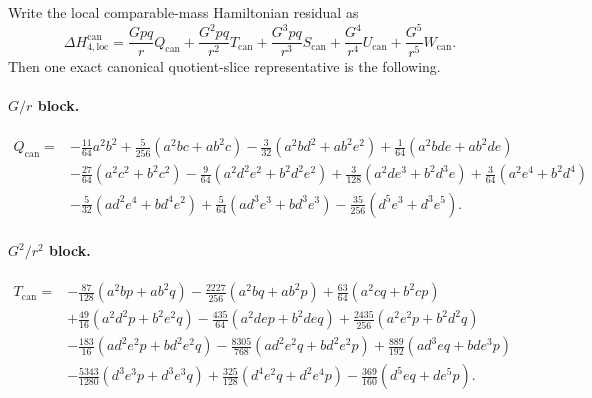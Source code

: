 \documentclass[11pt]{article}
\begin{document}
Write the local comparable-mass Hamiltonian residual as
\begin{equation}
\Delta H_{4,\mathrm{loc}}^{\mathrm{can}}
=
\frac{Gpq}{r}Q_{\mathrm{can}}
+
\frac{G^2pq}{r^2}T_{\mathrm{can}}
+
\frac{G^3pq}{r^3}S_{\mathrm{can}}
+
\frac{G^4}{r^4}U_{\mathrm{can}}
+
\frac{G^5}{r^5}W_{\mathrm{can}}.
\label{eq:app-canonical-slice-representative}
\end{equation}
Then one exact canonical quotient-slice representative is the following.

\paragraph{$G/r$ block.}
\begin{equation}
\begin{aligned}
Q_{\mathrm{can}}={}&
-\frac{11}{64}a^2b^2
+\frac{5}{256}(a^2bc+ab^2c)
-\frac{3}{32}(a^2bd^2+ab^2e^2)
+\frac{1}{64}(a^2bde+ab^2de)
\\
&-\frac{27}{64}(a^2c^2+b^2c^2)
-\frac{9}{64}(a^2d^2e^2+b^2d^2e^2)
+\frac{3}{128}(a^2de^3+b^2d^3e)
+\frac{3}{64}(a^2e^4+b^2d^4)
\\
&-\frac{5}{32}(ad^2e^4+bd^4e^2)
+\frac{5}{64}(ad^3e^3+bd^3e^3)
-\frac{35}{256}(d^5e^3+d^3e^5).
\end{aligned}
\label{eq:app-canonical-slice-Qcan}
\end{equation}

\paragraph{$G^2/r^2$ block.}
\begin{equation}
\begin{aligned}
T_{\mathrm{can}}={}&
-\frac{87}{128}(a^2bp+ab^2q)
-\frac{2227}{256}(a^2bq+ab^2p)
+\frac{63}{64}(a^2cq+b^2cp)
\\
&+\frac{49}{16}(a^2d^2p+b^2e^2q)
-\frac{435}{64}(a^2dep+b^2deq)
+\frac{2435}{256}(a^2e^2p+b^2d^2q)
\\
&-\frac{183}{16}(ad^2e^2p+bd^2e^2q)
-\frac{8305}{768}(ad^2e^2q+bd^2e^2p)
+\frac{889}{192}(ad^3eq+bde^3p)
\\
&-\frac{5343}{1280}(d^3e^3p+d^3e^3q)
+\frac{325}{128}(d^4e^2q+d^2e^4p)
-\frac{369}{160}(d^5eq+de^5p).
\end{aligned}
\label{eq:app-canonical-slice-Tcan}
\end{equation}
\end{document}
